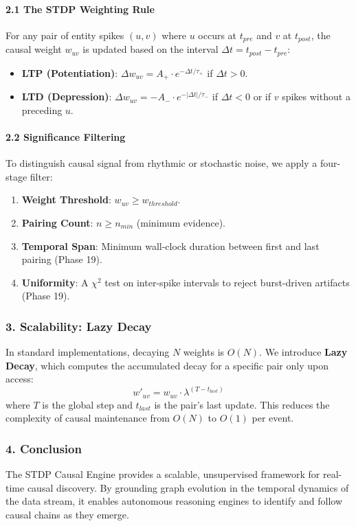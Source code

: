\paragraph{2.1 The STDP Weighting Rule}
For any pair of entity spikes $(u, v)$ where $u$ occurs at $t_{pre}$ and $v$ at $t_{post}$, the causal weight $w_{uv}$ is updated based on the interval $\Delta t = t_{post} - t_{pre}$:
\begin{itemize}
\item \textbf{LTP (Potent\-iation)}: $\Delta w_{uv} = A_+ \cdot e^{-\Delta t / \tau_+}$ if $\Delta t > 0$.
\item \textbf{LTD (Depression)}: $\Delta w_{uv} = -A_- \cdot e^{-|\Delta t| / \tau_-}$ if $\Delta t < 0$ or if $v$ spikes without a preceding $u$.

\end{itemize}
\paragraph{2.2 Signif\-icance Filtering}
To distinguish causal signal from rhythmic or stochastic noise, we apply a four-stage filter:
\begin{enumerate}
\item \textbf{Weight Threshold}: $w_{uv} \geq w_{threshold}$.
\item \textbf{Pairing Count}: $n \geq n_{min}$ (minimum evidence).
\item \textbf{Temporal Span}: Minimum wall-clock duration between first and last pairing (Phase 19).
\item \textbf{Uniformity}: A $\chi^2$ test on inter-spike intervals to reject burst-driven artifacts (Phase 19).

\end{enumerate}
\subsubsection{3. Scalability: Lazy Decay}
In standard imple\-mentations, decaying $N$ weights is $O(N)$. We introduce \textbf{Lazy Decay}, which computes the accumulated decay for a specific pair only upon access:
\begin{equation}
w'_{uv} = w_{uv} \cdot \lambda^{(T - t_{last})}
\end{equation}
where $T$ is the global step and $t_{last}$ is the pair's last update. This reduces the complexity of causal maintenance from $O(N)$ to $O(1)$ per event.

\subsubsection{4. Conclusion}
The STDP Causal Engine provides a scalable, unsup\-ervised framework for real-time causal discovery. By grounding graph evolution in the temporal dynamics of the data stream, it enables autonomous reasoning engines to identify and follow causal chains as they emerge.


